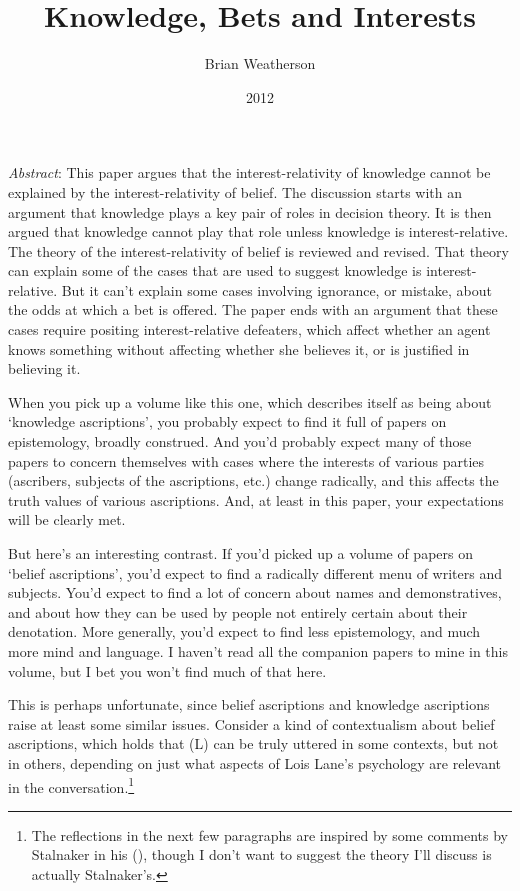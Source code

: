 \documentclass[
  11pt,
  letterpaper,
  DIV=11,
  numbers=noendperiod,
  twoside]{scrartcl}
\title{Knowledge, Bets and Interests}
\author{Brian Weatherson}
\date{2012}
\renewenvironment{abstract}
 {\vspace{-1.25cm}
 \quotation\small\noindent\emph{Abstract}:}
 {\endquotation}
\begin{document}
\maketitle
\begin{abstract}
This paper argues that the interest-relativity of knowledge cannot be
explained by the interest-relativity of belief. The discussion starts
with an argument that knowledge plays a key pair of roles in decision
theory. It is then argued that knowledge cannot play that role unless
knowledge is interest-relative. The theory of the interest-relativity of
belief is reviewed and revised. That theory can explain some of the
cases that are used to suggest knowledge is interest-relative. But it
can't explain some cases involving ignorance, or mistake, about the odds
at which a bet is offered. The paper ends with an argument that these
cases require positing interest-relative defeaters, which affect whether
an agent knows something without affecting whether she believes it, or
is justified in believing it.
\end{abstract}


When you pick up a volume like this one, which describes itself as being
about `knowledge ascriptions', you probably expect to find it full of
papers on epistemology, broadly construed. And you'd probably expect
many of those papers to concern themselves with cases where the
interests of various parties (ascribers, subjects of the ascriptions,
etc.) change radically, and this affects the truth values of various
ascriptions. And, at least in this paper, your expectations will be
clearly met.

But here's an interesting contrast. If you'd picked up a volume of
papers on `belief ascriptions', you'd expect to find a radically
different menu of writers and subjects. You'd expect to find a lot of
concern about names and demonstratives, and about how they can be used
by people not entirely certain about their denotation. More generally,
you'd expect to find less epistemology, and much more mind and language.
I haven't read all the companion papers to mine in this volume, but I
bet you won't find much of that here.

This is perhaps unfortunate, since belief ascriptions and knowledge
ascriptions raise at least some similar issues. Consider a kind of
contextualism about belief ascriptions, which holds that (L) can be
truly uttered in some contexts, but not in others, depending on just
what aspects of Lois Lane's psychology are relevant in the
conversation.\footnote{The reflections in the next few paragraphs are
  inspired by some comments by Stalnaker in his
  (), though I don't want to suggest
  the theory I'll discuss is actually Stalnaker's.}
\end{document}
